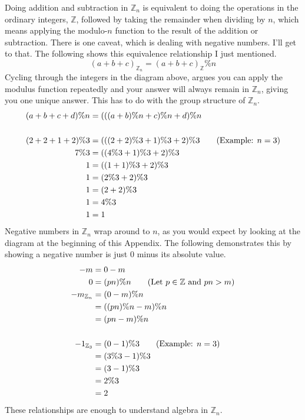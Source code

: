\documentclass[10pt]{article}
\begin{document}
Doing addition and subtraction in $\mathbb{Z}_n$ is equivalent to 
doing the operations in the ordinary integers, $\mathbb{Z}$,
followed by taking the remainder when dividing by 
$n$, which means applying the modulo-$n$ function to the result of the addition 
or subtraction. There is one caveat, 
which is dealing with negative numbers. I'll get to that. The following 
shows this equivalence relationship I just mentioned.
\begin{equation}
    (a+b+c)_{\mathbb{Z}_n}=(a+b+c)_{\mathbb{Z}}\%n \tag{$a,b,c\geq 0$}
\end{equation}
Cycling through the integers in the diagram above, argues
you can apply the modulus function repeatedly 
and your answer will always remain in $\mathbb{Z}_n$, giving you one unique 
answer. This has to do with the group structure of $\mathbb{Z}_n$. 
\begin{align}
    (a+b+c+d)\% n &= (((a+b)\% n + c)\%n + d)\% n \notag \\
    \notag \\
    (2+2+1+2)\% 3 &= (((2+2)\%3 + 1)\% 3 + 2)\% 3 \tag{Example: $n=3$}\\
    7\% 3 &= ((4\%3+1)\%3+ 2)\% 3 \notag \\
    1 &= ((1+1)\%3+ 2)\% 3 \notag \\
    1 &= (2\%3+ 2)\% 3 \notag \\
    1 &= (2 + 2)\% 3 \notag \\
    1 &= 4\% 3 \notag \\
    1 &= 1 \notag 
\end{align}
Negative numbers in $\mathbb{Z}_n$ wrap around to $n$, as you would expect 
by looking at the diagram at the beginning of this Appendix. The following 
demonstrates this by showing a negative number is just 0 minus its absolute 
value.
\begin{align}
    -m &= 0 - m \notag \\
    0 &= (pn)\%n \tag{Let $p\in\mathbb{Z}$ and $pn > m$}\\
    -m_{\mathbb{Z}_n} &= (0 - m)\%n \notag \\
    &= ((pn)\%n - m)\%n \notag \\
    &= (pn-m)\%n \notag \\
    \notag \\
    -1_{\mathbb{Z}_3} &= (0-1)\%3 \tag{Example: $n=3$} \\
    &= (3\%3-1)\%3 \notag \\
    &= (3-1)\%3 \notag \\
    &= 2\%3 \notag \\
    &= 2 \notag
\end{align}
These relationships are enough to understand algebra in $\mathbb{Z}_n$.
\end{document}

